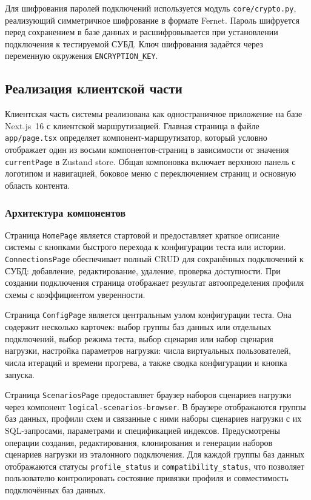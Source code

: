 Для шифрования паролей подключений используется модуль \texttt{core/crypto.py}, реализующий симметричное шифрование в формате Fernet. Пароль шифруется перед сохранением в базе данных и расшифровывается при установлении подключения к тестируемой СУБД. Ключ шифрования задаётся через переменную окружения \texttt{ENCRYPTION\_KEY}.

\subsection{Реализация клиентской части}

Клиентская часть системы реализована как одностраничное приложение на базе Next.js~16 с клиентской маршрутизацией. Главная страница в файле \texttt{app/page.tsx} определяет компонент-маршрутизатор, который условно отображает один из восьми компонентов-страниц в зависимости от значения \texttt{currentPage} в Zustand store. Общая компоновка включает верхнюю панель с логотипом и навигацией, боковое меню с переключением страниц и основную область контента.

\subsubsection{Архитектура компонентов}

Страница \texttt{HomePage} является стартовой и предоставляет краткое описание системы с кнопками быстрого перехода к конфигурации теста или истории. \texttt{ConnectionsPage} обеспечивает полный CRUD для сохранённых подключений к СУБД: добавление, редактирование, удаление, проверка доступности. При создании подключения страница отображает результат автоопределения профиля схемы с коэффициентом уверенности.

Страница \texttt{ConfigPage} является центральным узлом конфигурации теста. Она содержит несколько карточек: выбор группы баз данных или отдельных подключений, выбор режима теста, выбор сценария или набор сценария нагрузки, настройка параметров нагрузки: числа виртуальных пользователей, числа итераций и времени прогрева, а также сводка конфигурации и кнопка запуска.

Страница \texttt{ScenariosPage} предоставляет браузер наборов сценариев нагрузки через компонент \texttt{logical-scenarios-browser}. В браузере отображаются группы баз данных, профили схем и связанные с ними наборы сценариев нагрузки с их SQL-запросами, параметрами и спецификацией индексов. Предусмотрены операции создания, редактирования, клонирования и генерации наборов сценариев нагрузки из эталонного подключения. Для каждой группы баз данных отображаются статусы \texttt{profile\_status} и \texttt{compatibility\_status}, что позволяет пользователю контролировать состояние привязки профиля и совместимость подключённых баз данных.

